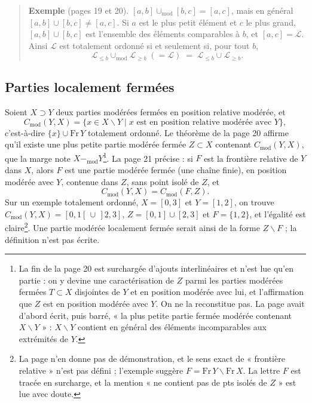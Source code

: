 \documentclass[11pt,a4paper]{article}
\begin{document}
\begin{quote}
\textbf{Exemple} (pages 19 et 20). $[a,b] \cup_{\mathrm{mod}} [b,c] = [a,c]$,
mais en général $[a,b] \cup [b,c] \neq [a,c]$. Si $a$ est le plus petit élément
et $c$ le plus grand, $[a,b] \cup [b,c]$ est l'ensemble des éléments
comparables à $b$, et $[a,c] = \mathcal{L}$. Ainsi $\mathcal{L}$ est totalement
ordonné si et seulement si, pour tout $b$,
\[
\mathcal{L}_{\leq b} \cup_{\mathrm{mod}} \mathcal{L}_{\geq b} \;(=
\mathcal{L}) \;=\; \mathcal{L}_{\leq b} \cup \mathcal{L}_{\geq b}.
\]
\end{quote}

\subsection*{Parties localement fermées}

Soient $X \supset Y$ deux parties modérées fermées en position relative modérée,
et
\[
C_{\mathrm{mod}}(Y,X) = \{x \in X \smallsetminus Y \mid x \text{ est en position
relative modérée avec } Y\},
\]
c'est-à-dire $\{x\} \cup \mathrm{Fr}\, Y$ totalement ordonné. Le théorème de la
page 20 affirme qu'il existe une plus petite partie modérée fermée $Z \subset X$
contenant $C_{\mathrm{mod}}(Y,X)$, que la marge note $X
\mathbin{-_{\mathrm{mod}}} Y$\footnote{La fin de la page 20 est surchargée
d'ajouts interlinéaires et n'est lue qu'en partie : on y devine une
caractérisation de $Z$ parmi les parties modérées fermées $T \subset X$
disjointes de $Y$ et en position modérée avec lui, et l'affirmation que $Z$ est
en position modérée avec $Y$. On ne la reconstitue pas. La page avait d'abord
écrit, puis barré, « la plus petite partie fermée modérée contenant $X
\smallsetminus Y$ » : $X \smallsetminus Y$ contient en général des éléments
incomparables aux extrémités de $Y$.}. La page 21 précise : si $F$ est la
frontière relative de $Y$ dans $X$, alors $F$ est une partie modérée fermée (une
chaîne finie), en position modérée avec $Y$, contenue dans $Z$, sans point
isolé de $Z$, et
\[
C_{\mathrm{mod}}(Y,X) = C_{\mathrm{mod}}(F, Z) .
\]
Sur un exemple totalement ordonné, $X = [0,3]$ et $Y = [1,2]$, on trouve
$C_{\mathrm{mod}}(Y,X) = [0,1[ \,\cup\, ]2,3]$, $Z = [0,1] \cup [2,3]$ et $F =
\{1,2\}$, et l'égalité est claire\footnote{La page n'en donne pas de
démonstration, et le sens exact de « frontière relative » n'est pas défini ;
l'exemple suggère $F = \mathrm{Fr}\, Y \smallsetminus \mathrm{Fr}\, X$. La lettre
$F$ est tracée en surcharge, et la mention « ne contient pas de pts isolés de
$Z$ » est lue avec doute.}. Une partie modérée localement fermée
serait ainsi de la forme $Z \smallsetminus F$ ; la définition n'est pas écrite.
\end{document}
